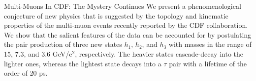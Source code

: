 
\begin{topQuark}[enhanced, tikz={rotate=0}]{Multi-Muons In CDF: The Mystery Continues}
    We present a phenomenological conjecture of new physics that is suggested
    by the topology and kinematic properties of the multi-muon events recently
    reported by the CDF collaboration. We show that the salient features of 
    the data can be accounted for by postulating the pair production of
    three new states $h_1$, $h_2$, and $h_3$ with masses in the range
    of 15, 7.3, and 3.6 GeV/c$^{2}$, respectively. The heavier states 
    cascade-decay into the lighter ones, whereas the lightest state 
    decays into a $\tau$ pair with a lifetime of the order of 20 ps.

\end{topQuark}
